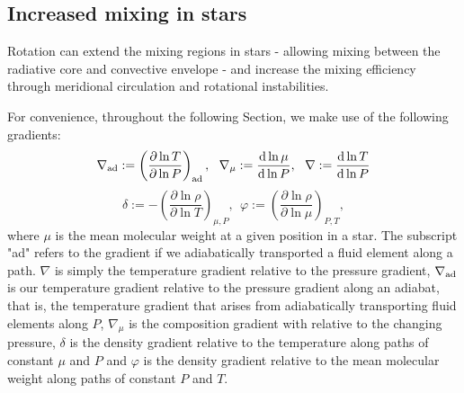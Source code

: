 \subsection{Increased mixing in stars}

Rotation can extend the mixing regions in stars - allowing mixing between the radiative core and convective envelope - and increase the mixing efficiency through meridional circulation and rotational instabilities.

For convenience, throughout the following Section, we make use of the following gradients:
\begin{equation}
    \nabla_{\textnormal{ad}} := \left(\frac{\partial \ln T}{\partial \ln P}\right)_{\textnormal{ad}}, \ \  \nabla_{\mu} := \frac{\textmd{d} \ln \mu}{ \textmd{d} \ln P}, \ \ \nabla := \frac{\textmd{d} \ln T}{\textmd{d} \ln P}
\end{equation}
\begin{equation}
    \delta := -\left(\frac{\partial\ln \rho}{\partial \ln T}\right)_{\mu,P}, \ \  \varphi := \left(\frac{\partial \ln \rho}{\partial \ln \mu}\right)_{P,T},
\end{equation}
where $\mu$ is the mean molecular weight at a given position in a star. The subscript "ad" refers to the gradient if we adiabatically transported a fluid element along a path.
$\nabla$ is simply the temperature gradient relative to the pressure gradient, $\nabla_{\textnormal{ad}}$ is our temperature gradient relative to the pressure gradient along an adiabat, that is, the temperature gradient that arises from adiabatically transporting fluid elements along $P$, $\nabla_{\mu}$ is the composition gradient with relative to the changing pressure, $\delta$ is the density gradient relative to the temperature along paths of constant $\mu$ and $P$ and $\varphi$ is the density gradient relative to the mean molecular weight along paths of constant $P$ and $T$.

